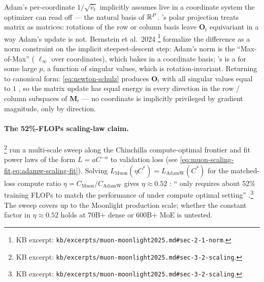 \begin{intuition}
\label{intuit:muon-vs-adamw}
Adam's per-coordinate $1/\sqrt{\hat{v}_t}$ implicitly assumes
 live in a coordinate system the optimizer can read off ---
the natural basis of $\mathbb{R}^P$. 's polar projection treats matrix
 as matrices: rotations of the row or column basis leave
$\mathbf{O}_t$ equivariant in a way Adam's update is not. Bernstein
et al.\ 2024 \citep[\S 2.1]{muon-moonlight2025}\protect\footnote{KB
excerpt: \nolinkurl{kb/excerpts/muon-moonlight2025.md#sec-2-1-norm}.}
formalize the difference as a norm constraint on the implicit
steepest-descent step: Adam's norm is the ``Max-of-Max'' (
$\ell_\infty$ over coordinates), which bakes in a coordinate basis;
's is a  for some large $p$, a function of
singular values, which is rotation-invariant. Returning to canonical
form: \cref{eq:newton-schulz} produces $\mathbf{O}_t$ with all
singular values equal to $1$ \citep[\S
2.1]{muon-moonlight2025}, so the matrix update has equal energy in
every direction in the row / column subspaces of $\mathbf{M}_t$ ---
no coordinate is implicitly privileged by gradient magnitude, only
by direction.
\end{intuition}

\paragraph{The 52\%-FLOPs scaling-law claim.}
\citet[\S 3.2]{muon-moonlight2025}\footnote{KB excerpt:
\nolinkurl{kb/excerpts/muon-moonlight2025.md#sec-3-2-scaling}.} run a
multi-scale sweep along the Chinchilla compute-optimal frontier and
fit power laws of the form $L = a C^{-\alpha}$ to validation loss
(see \cref{eq:muon-scaling-fit,eq:adamw-scaling-fit}). Solving
$L_{\mathrm{Muon}}(\eta C^*) = L_{\mathrm{AdamW}}(C^*)$ for the
matched-loss compute ratio $\eta = C_{\mathrm{Muon}} /
C_{\mathrm{AdamW}}$ gives $\eta \approx 0.52$
\citep[Figure 1a]{muon-moonlight2025}: `` only requires about
52\% training FLOPs to match the performance of  under
compute optimal setting'' \citep[\S
3.2]{muon-moonlight2025}.\footnote{KB excerpt:
\nolinkurl{kb/excerpts/muon-moonlight2025.md#sec-3-2-scaling}.} The
sweep covers up to the Moonlight production scale; whether the
constant factor in $\eta \approx 0.52$ holds at $70$B+ dense or
$600$B+ MoE is untested.

